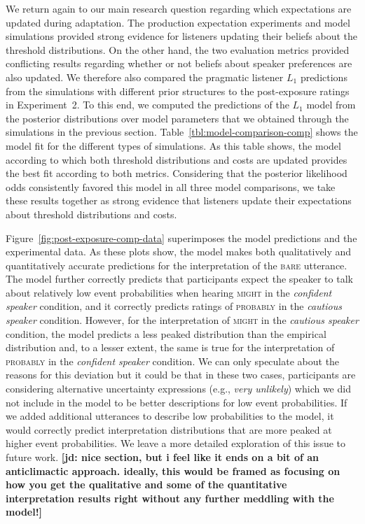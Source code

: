 \documentclass[lucida,biblatex]{sp} %
\newcommand{\jd}[1]{\textcolor{PinkyPurple}{\textbf{[jd: #1]}}}
\newcommand{\tableref}[1]{Table~\ref{#1}}
\newcommand{\figref}[1]{Figure~\ref{#1}}
\begin{document}
We return again to our main research question regarding which expectations are updated during adaptation. The production expectation experiments and model simulations provided strong evidence for listeners updating 
their beliefs about the threshold distributions. On the other hand, the two evaluation metrics provided conflicting results regarding whether or not beliefs about speaker preferences are also updated.
We therefore also compared the pragmatic listener $L_1$ predictions from the simulations with different prior structures to the post-exposure ratings in Experiment~2. To this end, we computed the predictions of the $L_1$ model from the
posterior distributions over model parameters that we obtained through the simulations in the previous section. \tableref{tbl:model-comparison-comp} shows the model fit
for the different types of simulations. As this table shows, the model according to which both threshold distributions and costs are updated provides the best fit according to both metrics. 
Considering that the posterior likelihood odds consistently favored this model in all three model comparisons, we take these results together as strong evidence that listeners update their expectations about threshold distributions
and costs. 

\figref{fig:post-exposure-comp-data} superimposes the model predictions and the experimental data. As these plots show, the model makes both qualitatively and quantitatively accurate predictions for the interpretation of the \textsc{bare} utterance. The model further correctly predicts that participants expect the speaker to talk about relatively low event probabilities when hearing \textsc{might} in the \textit{confident speaker} condition, and it correctly predicts ratings of \textsc{probably} in the \textit{cautious speaker} condition. However, for the interpretation of \textsc{might} in the \textit{cautious speaker} condition, the model predicts a less peaked distribution than the empirical distribution and, to a lesser extent, the same is true for the interpretation of \textsc{probably} in the \textit{confident speaker} condition. We can only speculate about the reasons for this deviation but it could be that in these two cases, participants are considering alternative uncertainty expressions (e.g., \textit{very unlikely}) which we did not include in the model to be better descriptions for low event probabilities. If we added additional utterances to describe low probabilities to the model, it would correctly predict interpretation distributions that are more peaked at higher event probabilities. We leave a more detailed exploration of this issue to future work. \jd{nice section, but i feel like it ends on a bit of an anticlimactic approach. ideally, this would be framed as focusing on how you get the qualitative and some of the quantitative interpretation results right without any further meddling with the model!}
\end{document}
